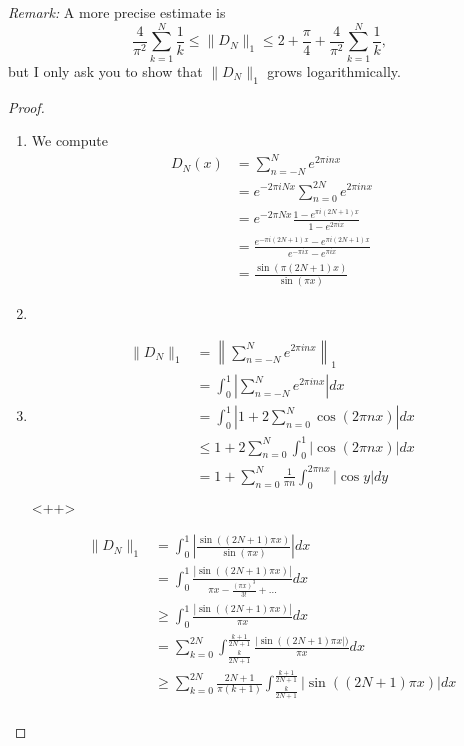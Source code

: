 \documentclass[a4paper]{article}
\begin{document}
\begin{enumerate}
\begin{enumerate}[(a)]
{\it{Remark:}}  A more precise estimate is $$ \frac{4}{\pi^2} \sum_{k=1}^N \frac1{k} \le \| D_N \|_1 \le 2 + \frac{\pi}{4} +   \frac{4}{\pi^2} \sum_{k=1}^N \frac1{k},$$ but I only ask you to show that $\| D_N \|_1$ grows logarithmically.
\end{enumerate}

\begin{proof}
  \begin{enumerate}
    \item
      We compute
      \begin{align*}
        D_N(x) &= \sum_{n=-N}^N e^{2 \pi i n x} \\
        &= e^{-2 \pi i N x} \sum_{n=0}^{2N} e^{2 \pi i n x} \\
        &= e^{-2 \pi N x} \frac{1 - e^{\pi i (2N+1)x}}{1 - e^{2 \pi i x}} \\
        &= \frac{e^{-\pi i (2N+1)x} - e^{\pi i (2N+1) x}}{ e^{-\pi i x} - e^{ \pi i x}} \\
        &= \frac{\sin \left( \pi (2N+1)x \right)}{\sin \left( \pi x \right)}
      \end{align*}

    \item

    \item
      \begin{align*}
        \| D_N \|_1 &= \left\| \sum_{n = -N}^N e^{2 \pi i n x} \right\|_1 \\
        &= \int_{0}^{1} \left| \sum_{n=-N}^N e^{2 \pi i n x} \right| dx \\
        &= \int_{0}^{1} \left| 1 + 2 \sum_{n = 0}^N \cos( 2 \pi n x) \right| dx \\
        &\leq 1 + 2 \sum_{n = 0}^N \int_{0}^{1} \left| \cos(2 \pi n x) \right| dx \\
        &= 1 + \sum_{n=0}^N \frac{1}{\pi n} \int_{0}^{2 \pi n x} | \cos y | dy \\
      \end{align*}<++>

      \begin{align*}
        \| D_N \|_1 &= \int_{0}^{1} \left| \frac{\sin \left( (2N+1) \pi x \right)}{\sin (\pi x)} \right| dx \\
        &= \int_{0}^{1} \frac{ | \sin \left( ( 2N+1 ) \pi x \right) |}{ \pi x - \frac{(\pi x)^3}{3!} + \dots} dx \\
        &\geq \int_{0}^{1} \frac{| \sin \left( ( 2N+1 ) \pi x \right) |}{\pi x} dx \\
        &= \sum_{k=0}^{2N} \int_{\frac{k}{2N+1}}^{\frac{k+1}{2N+1}} \frac{| \sin \left( ( 2N+1 ) \pi x \right |)}{\pi x} dx \\
        &\geq \sum_{k = 0}^{2N} \frac{2N+1}{\pi (k+1)} \int_{\frac{k}{2N+1}}^{\frac{k+1}{2N+1}} | \sin \left( (2N+1) \pi x \right) | dx \\
      \end{align*}


\end{enumerate}
\end{proof}
\end{enumerate}
\end{document}
